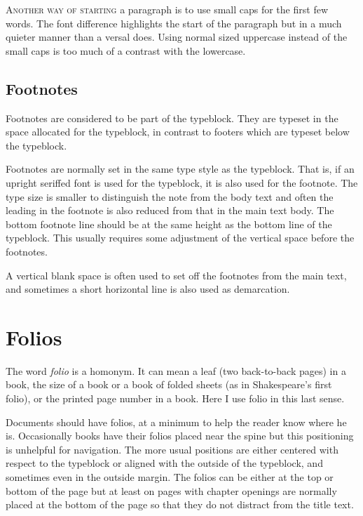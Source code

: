 \documentclass[10pt,letterpaper,extrafontsizes]{memoir}
\begin{document}
\noindent \textsc{Another way of starting} a paragraph is to use small
caps for the first few words. The font difference highlights the start
of the paragraph but in a much quieter manner than a versal does. Using
normal sized uppercase instead of the small caps is too much of a 
contrast with the lowercase.


\subsection{Footnotes}

    Footnotes are considered to be part of the typeblock. 
They are typeset in the space allocated for the typeblock, 
in contrast to footers
which are typeset below the typeblock.

    Footnotes are normally set in the same type style as the 
typeblock. That is, if an upright seriffed font is used 
for the typeblock, it is
also used for the footnote. The
type size is smaller to distinguish the note from the body text and often
the leading in the footnote is also reduced from that in the main text body.
The bottom footnote line should be at the same height as the bottom line
of the typeblock. This usually requires some adjustment 
of the vertical space before the footnotes.

    A vertical blank space is often used to set off the footnotes from the
main text, and sometimes a short horizontal line is also used as demarcation.


\section{Folios}


    The word \emph{folio} is a homonym. It can mean a leaf 
(two back-to-back pages) in a book, the size of a book or a book of
folded sheets (as in Shakespeare's first folio), or the printed page number
in a book. Here I use folio in this last sense.

    Documents should have folios, at a minimum to help the reader know where
he is. Occasionally books have their folios placed near the spine but this
positioning is unhelpful for navigation. The more usual positions are
either centered with respect to the typeblock or aligned 
with the outside of the typeblock, and sometimes even in 
the outside margin. The folios
can be either at the top or bottom of the page but at least on pages 
with chapter openings are normally placed at the bottom of 
the page so that they do not distract from the title text.
\end{document}

